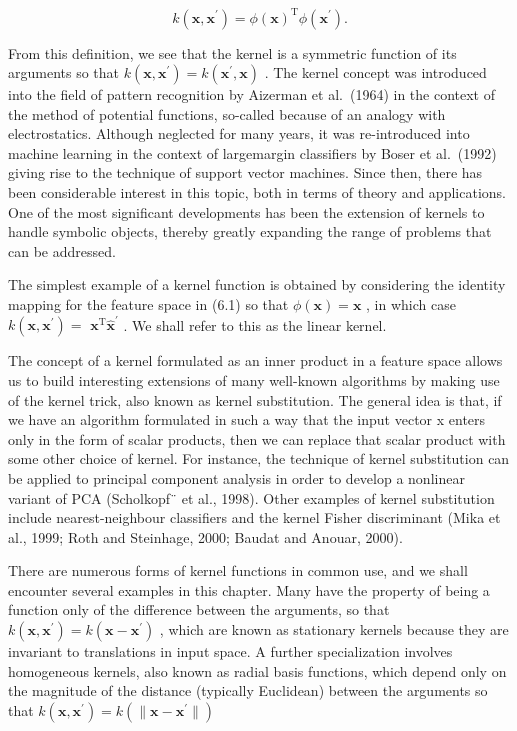 \documentclass[
  10
]{article}
\begin{document}
\[
k (\mathbf {x}, \mathbf {x} ^ {\prime}) = \phi (\mathbf {x}) ^ {\mathrm{T}} \phi (\mathbf {x} ^ {\prime}).\tag{6.1}
\]

From this definition, we see that the kernel is a symmetric function of
its arguments so that
\(k ( \mathbf { x } , \mathbf { x } ^ { \prime } ) = k ( \mathbf { x } ^ { \prime } , \mathbf { x } )\)
. The kernel concept was introduced into the field of pattern
recognition by Aizerman et al.~(1964) in the context of the method of
potential functions, so-called because of an analogy with
electrostatics. Although neglected for many years, it was re-introduced
into machine learning in the context of largemargin classifiers by Boser
et al.~(1992) giving rise to the technique of support vector machines.
Since then, there has been considerable interest in this topic, both in
terms of theory and applications. One of the most significant
developments has been the extension of kernels to handle symbolic
objects, thereby greatly expanding the range of problems that can be
addressed.

The simplest example of a kernel function is obtained by considering the
identity mapping for the feature space in (6.1) so that
\(\phi ( \mathbf { x } ) = \mathbf { x }\) , in which case
\(k ( \mathbf { x } , \mathbf { x } ^ { \prime } ) =\)
\(\mathbf { x } ^ { \mathrm { { T } } } \mathbf { \hat { x } } ^ { \prime }\)
. We shall refer to this as the linear kernel.

The concept of a kernel formulated as an inner product in a feature
space allows us to build interesting extensions of many well-known
algorithms by making use of the kernel trick, also known as kernel
substitution. The general idea is that, if we have an algorithm
formulated in such a way that the input vector x enters only in the form
of scalar products, then we can replace that scalar product with some
other choice of kernel. For instance, the technique of kernel
substitution can be applied to principal component analysis in order to
develop a nonlinear variant of PCA (Scholkopf¨ et al., 1998). Other
examples of kernel substitution include nearest-neighbour classifiers
and the kernel Fisher discriminant (Mika et al., 1999; Roth and
Steinhage, 2000; Baudat and Anouar, 2000).

There are numerous forms of kernel functions in common use, and we shall
encounter several examples in this chapter. Many have the property of
being a function only of the difference between the arguments, so that
\(k ( \mathbf { x } , \mathbf { x } ^ { \prime } ) = k ( \mathbf { x } - \mathbf { x } ^ { \prime } )\)
, which are known as stationary kernels because they are invariant to
translations in input space. A further specialization involves
homogeneous kernels, also known as radial basis functions, which depend
only on the magnitude of the distance (typically Euclidean) between the
arguments so that
\(k ( \mathbf { x } , \mathbf { x } ^ { \prime } ) = k ( \| \mathbf { x } - \mathbf { x } ^ { \prime } \| )\)
\end{document}
